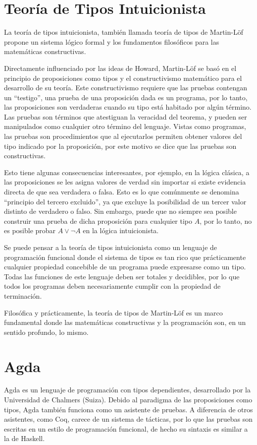 \section{Teoría de Tipos Intuicionista}
La teoría de tipos intuicionista, también llamada teoría de tipos de Martin-Löf \cite{MLTT72, MLTT73, MLTT79, Bibliopolis} propone un sistema lógico formal y los fundamentos filosóficos para las matemáticas constructivas.

Directamente influenciado por las ideas de Howard, Martin-Löf se basó en el principio de proposiciones como tipos y el constructivismo matemático para el desarrollo de su teoría.
Este constructivismo requiere que las pruebas contengan un ``testigo'', una prueba de una proposición dada es un programa, por lo tanto, las proposiciones son verdaderas cuando su tipo está habitado por algún término.
Las pruebas son términos que atestiguan la veracidad del teorema, y pueden ser manipulados como cualquier otro término del lenguaje.
Vistas como programas, las pruebas son procedimientos que al ejecutarlos permiten obtener valores del tipo indicado por la proposición, por este motivo se dice que las pruebas son constructivas.

Esto tiene algunas consecuencias interesantes, por ejemplo, en la lógica clásica, a las proposiciones se les asigna valores de verdad sin importar si existe evidencia directa de que sea verdadera o falsa.
Esto es lo que comúnmente se denomina ``principio del tercero excluido'', ya que excluye la posibilidad de un tercer valor distinto de verdadero o falso.
Sin embargo, puede que no siempre sea posible construir una prueba de dicha proposición para cualquier tipo $A$, por lo tanto, no es posible probar $A \vee \neg A$ en la lógica intuicionista.


Se puede pensar a la teoría de tipos intuicionista como un lenguaje de programación funcional donde el sistema de tipos es tan rico que prácticamente cualquier propiedad concebible de un programa puede expresarse como un tipo.
Todas las funciones de este lenguaje deben ser totales y decidibles, por lo que todos los programas deben necesariamente cumplir con la propiedad de terminación.

Filosófica y prácticamente, la teoría de tipos de Martin-Löf es un marco fundamental donde las matemáticas constructivas y la programación son, en un sentido profundo, lo mismo.


\section{Agda}
Agda es un lenguaje de programación con tipos dependientes, desarrollado por la Universidad de
Chalmers (Suiza).
Debido al paradigma de las proposiciones como tipos, Agda también funciona como un asistente de pruebas.
A diferencia de otros asistentes, como Coq, carece de un sistema de tácticas, por lo que las pruebas son escritas en un estilo de programación funcional, de hecho su sintaxis es similar a la de Haskell.

